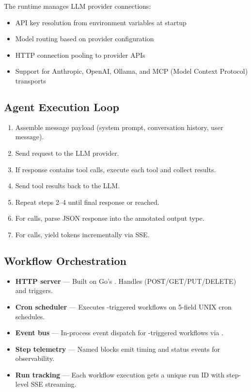 The runtime manages LLM provider connections:

\begin{itemize}
    \item API key resolution from environment variables at startup
    \item Model routing based on provider configuration
    \item HTTP connection pooling to provider APIs
    \item Support for Anthropic, OpenAI, Ollama, and MCP (Model Context Protocol) transports
\end{itemize}

\subsection{Agent Execution Loop}

\begin{enumerate}
    \item Assemble message payload (system prompt, conversation history, user message).
    \item Send request to the LLM provider.
    \item If response contains tool calls, execute each tool and collect results.
    \item Send tool results back to the LLM.
    \item Repeat steps 2--4 until final response or  reached.
    \item For  calls, parse JSON response into the annotated output type.
    \item For  calls, yield tokens incrementally via SSE.
\end{enumerate}

\subsection{Workflow Orchestration}

\begin{itemize}
    \item \textbf{HTTP server} --- Built on Go's . Handles  (POST/GET/PUT/DELETE) and  triggers.
    \item \textbf{Cron scheduler} --- Executes -triggered workflows on 5-field UNIX cron schedules.
    \item \textbf{Event bus} --- In-process event dispatch for -triggered workflows via .
    \item \textbf{Step telemetry} --- Named  blocks emit timing and status events for observability.
    \item \textbf{Run tracking} --- Each workflow execution gets a unique run ID with step-level SSE streaming.
\end{itemize}

